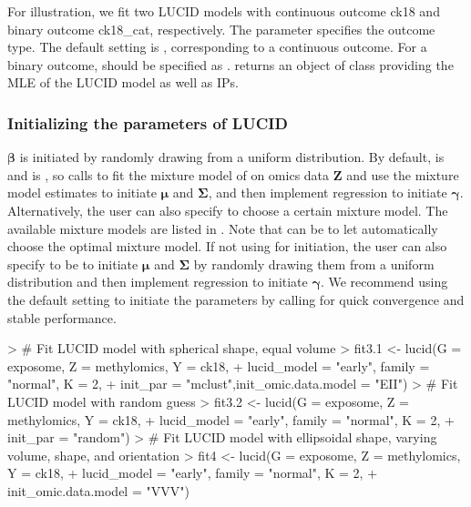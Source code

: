 For illustration, we fit two LUCID models with continuous outcome ck18 and binary outcome ck18\_cat, respectively. The parameter  specifies the outcome type. The default setting is , corresponding to a continuous outcome. For a binary outcome,  should be specified as .  returns an object of class  providing the MLE of the LUCID model as well as IPs.
\subsubsection{Initializing the parameters of LUCID} \label{sec3.1.1}
$\bm \beta$ is initiated by randomly drawing from a uniform distribution. By default,  is  and  is , so  calls  to fit the mixture model of  on omics data $\bm Z$ and use the mixture model estimates to initiate $\bm \mu$ and $\bm \Sigma$, and then implement regression to initiate $\bm \gamma$. Alternatively, the user can also specify  to choose a certain mixture model. The available mixture models are listed in  \citep{scrucca2016mclust}. Note that  can be  to let  automatically choose the optimal mixture model. If not using  for initiation, the user can also specify  to be  to initiate $\bm \mu$ and $\bm \Sigma$ by randomly drawing them from a uniform distribution and then implement regression to initiate $\bm \gamma$. We recommend using the default setting to initiate the parameters by calling  for quick convergence and stable performance.
\begin{example}
> # Fit LUCID model with spherical shape, equal volume
> fit3.1 <- lucid(G = exposome, Z = methylomics, Y = ck18, 
+                 lucid_model = "early", family = "normal", K = 2,
+                 init_par = "mclust",init_omic.data.model = "EII")
> # Fit LUCID model with random guess
> fit3.2 <- lucid(G = exposome, Z = methylomics, Y = ck18, 
+                 lucid_model = "early", family = "normal", K = 2,
+                 init_par = "random")
> # Fit LUCID model with ellipsoidal shape, varying volume, shape, and orientation 
> fit4 <- lucid(G = exposome, Z = methylomics, Y = ck18, 
+               lucid_model = "early", family = "normal", K = 2,
+               init_omic.data.model = "VVV")
\end{example}
